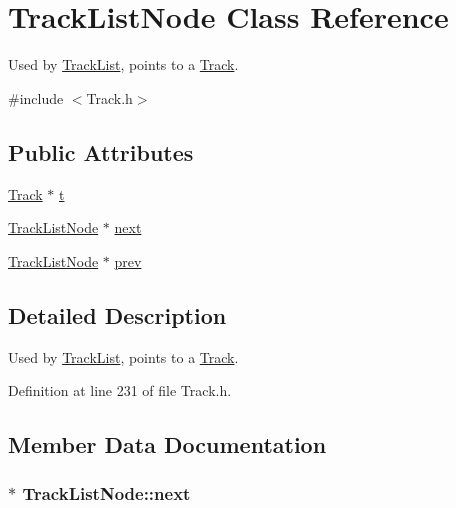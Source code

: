 \hypertarget{struct_track_list_node}{}\section{Track\+List\+Node Class Reference}
\label{struct_track_list_node}


Used by \hyperlink{class_track_list}{Track\+List}, points to a \hyperlink{class_track}{Track}.  




{\ttfamily \#include $<$Track.\+h$>$}

\subsection*{Public Attributes}
\begin{DoxyCompactItemize}
\item 
\hyperlink{class_track}{Track} $\ast$ \hyperlink{struct_track_list_node_a26289d63f33d878f15946ad938f7d73a}{t}
\item 
\hyperlink{struct_track_list_node}{Track\+List\+Node} $\ast$ \hyperlink{struct_track_list_node_a8a36ff5edca955b4906da6cb632f4a23}{next}
\item 
\hyperlink{struct_track_list_node}{Track\+List\+Node} $\ast$ \hyperlink{struct_track_list_node_a64fd2e1b6e421a0ff6438d828074e4c5}{prev}
\end{DoxyCompactItemize}


\subsection{Detailed Description}
Used by \hyperlink{class_track_list}{Track\+List}, points to a \hyperlink{class_track}{Track}. 

Definition at line 231 of file Track.\+h.



\subsection{Member Data Documentation}
\subsubsection[{\texorpdfstring{next}{next}}]{$\ast$ Track\+List\+Node\+::next}\hypertarget{struct_track_list_node_a8a36ff5edca955b4906da6cb632f4a23}{}\label{struct_track_list_node_a8a36ff5edca955b4906da6cb632f4a23}


